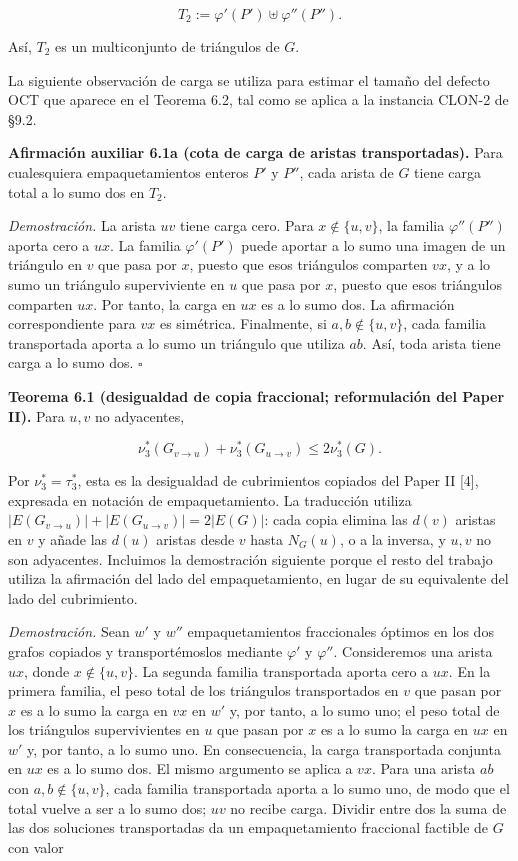 \documentclass[spanish,11pt,a4paper]{article}
\begin{document}
\[
T_2:=\varphi'(P')\uplus\varphi''(P'').
\]

Así, \(T_2\) es un multiconjunto de triángulos de \(G\).

La siguiente observación de carga se utiliza para estimar el tamaño del
defecto OCT que aparece en el Teorema 6.2, tal como se aplica a la
instancia CLON-2 de §9.2.

\textbf{Afirmación auxiliar 6.1a (cota de carga de aristas
transportadas).} Para cualesquiera empaquetamientos enteros \(P'\) y
\(P''\), cada arista de \(G\) tiene carga total a lo sumo dos en
\(T_2\).

\emph{Demostración.} La arista \(uv\) tiene carga cero. Para
\(x\notin\{u,v\}\), la familia \(\varphi''(P'')\) aporta cero a \(ux\).
La familia \(\varphi'(P')\) puede aportar a lo sumo una imagen de un
triángulo en \(v\) que pasa por \(x\), puesto que esos triángulos
comparten \(vx\), y a lo sumo un triángulo superviviente en \(u\) que
pasa por \(x\), puesto que esos triángulos comparten \(ux\). Por tanto,
la carga en \(ux\) es a lo sumo dos. La afirmación correspondiente para
\(vx\) es simétrica. Finalmente, si \(a,b\notin\{u,v\}\), cada familia
transportada aporta a lo sumo un triángulo que utiliza \(ab\). Así, toda
arista tiene carga a lo sumo dos. \(\square\)

\textbf{Teorema 6.1 (desigualdad de copia fraccional; reformulación del
Paper II).} Para \(u,v\) no adyacentes,

\[
\nu_3^*(G_{v\to u})+\nu_3^*(G_{u\to v})
\le
2\nu_3^*(G).
\]

Por \(\nu_3^*=\tau_3^*\), esta es la desigualdad de cubrimientos
copiados del Paper II {[}4{]}, expresada en notación de empaquetamiento.
La traducción utiliza \(|E(G_{v\to u})|+|E(G_{u\to v})|=2|E(G)|\): cada
copia elimina las \(d(v)\) aristas en \(v\) y añade las \(d(u)\) aristas
desde \(v\) hasta \(N_G(u)\), o a la inversa, y \(u,v\) no son
adyacentes. Incluimos la demostración siguiente porque el resto del
trabajo utiliza la afirmación del lado del empaquetamiento, en lugar de
su equivalente del lado del cubrimiento.

\emph{Demostración.} Sean \(w'\) y \(w''\) empaquetamientos fraccionales
óptimos en los dos grafos copiados y transportémoslos mediante
\(\varphi'\) y \(\varphi''\). Consideremos una arista \(ux\), donde
\(x\notin\{u,v\}\). La segunda familia transportada aporta cero a
\(ux\). En la primera familia, el peso total de los triángulos
transportados en \(v\) que pasan por \(x\) es a lo sumo la carga en
\(vx\) en \(w'\) y, por tanto, a lo sumo uno; el peso total de los
triángulos supervivientes en \(u\) que pasan por \(x\) es a lo sumo la
carga en \(ux\) en \(w'\) y, por tanto, a lo sumo uno. En consecuencia,
la carga transportada conjunta en \(ux\) es a lo sumo dos. El mismo
argumento se aplica a \(vx\). Para una arista \(ab\) con
\(a,b\notin\{u,v\}\), cada familia transportada aporta a lo sumo uno, de
modo que el total vuelve a ser a lo sumo dos; \(uv\) no recibe carga.
Dividir entre dos la suma de las dos soluciones transportadas da un
empaquetamiento fraccional factible de \(G\) con valor
\end{document}
